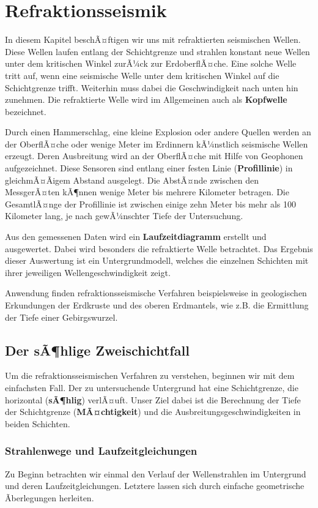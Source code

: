 \chapter{Refraktionsseismik}
In diesem Kapitel beschÃ¤ftigen wir uns mit refraktierten seismischen Wellen. Diese Wellen laufen entlang der Schichtgrenze und strahlen konstant neue Wellen unter dem kritischen Winkel zurÃ¼ck zur ErdoberflÃ¤che. Eine solche Welle tritt auf, wenn eine seismische Welle unter dem kritischen Winkel auf die Schichtgrenze trifft. Weiterhin muss dabei die Geschwindigkeit nach unten hin zunehmen. Die refraktierte Welle wird im Allgemeinen auch als \textbf{Kopfwelle} bezeichnet. 

Durch einen Hammerschlag, eine kleine Explosion oder andere Quellen werden an der OberflÃ¤che oder wenige Meter im Erdinnern kÃ¼nstlich seismische Wellen erzeugt. Deren Ausbreitung wird an der OberflÃ¤che mit Hilfe von Geophonen aufgezeichnet. Diese Sensoren sind entlang einer festen Linie (\textbf{Profillinie}) in gleichmÃ¤Ãigem Abstand ausgelegt. Die AbstÃ¤nde zwischen den MessgerÃ¤ten kÃ¶nnen wenige Meter bis mehrere Kilometer betragen. Die GesamtlÃ¤nge der Profillinie ist zwischen einige zehn Meter bis mehr als 100 Kilometer lang, je nach gewÃ¼nschter Tiefe der Untersuchung. 

Aus den gemessenen Daten wird ein \textbf{Laufzeitdiagramm} erstellt und ausgewertet. Dabei wird besonders die refraktierte Welle betrachtet. Das Ergebnis dieser Auswertung ist ein Untergrundmodell, welches die einzelnen Schichten mit ihrer jeweiligen Wellengeschwindigkeit zeigt.  

Anwendung finden refraktionsseismische Verfahren beispielsweise in geologischen Erkundungen der Erdkruste und des oberen Erdmantels, wie z.B. die Ermittlung der Tiefe einer Gebirgswurzel.   

\section{Der sÃ¶hlige Zweischichtfall}
Um die refraktionsseismischen Verfahren zu verstehen, beginnen wir mit dem einfachsten Fall. Der zu untersuchende Untergrund hat eine Schichtgrenze, die horizontal (\textbf{sÃ¶hlig}) verlÃ¤uft. Unser Ziel dabei ist die Berechnung der Tiefe der Schichtgrenze (\textbf{MÃ¤chtigkeit}) und die Ausbreitungsgeschwindigkeiten in beiden Schichten.

\subsection{Strahlenwege und Laufzeitgleichungen}
Zu Beginn betrachten wir einmal den Verlauf der Wellenstrahlen im Untergrund und deren Laufzeitgleichungen. Letztere lassen sich durch einfache geometrische Ãberlegungen herleiten. 

